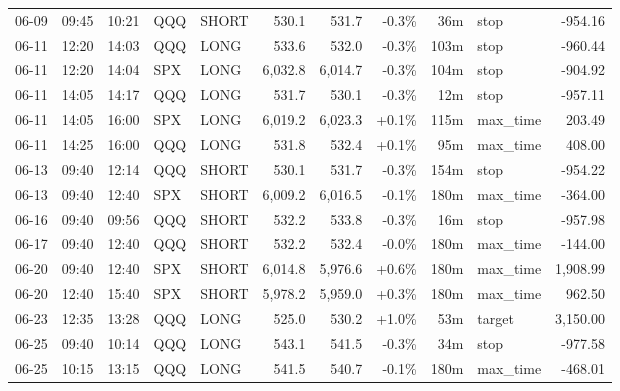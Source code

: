 \documentclass[11pt,a4paper,twoside]{article}
\begin{document}
\begin{center}
\begin{longtable}{>{\color{txtmain}}l l l l l r r r r >{\color{txtmain}}l r}
06-09 & 09:45 & 10:21 & QQQ & SHORT & 530.1 & 531.7 & \textcolor{lossred}{-0.3\%} & 36m & stop & \textcolor{lossred}{-954.16} \\
06-11 & 12:20 & 14:03 & QQQ & LONG & 533.6 & 532.0 & \textcolor{lossred}{-0.3\%} & 103m & stop & \textcolor{lossred}{-960.44} \\
06-11 & 12:20 & 14:04 & SPX & LONG & 6,032.8 & 6,014.7 & \textcolor{lossred}{-0.3\%} & 104m & stop & \textcolor{lossred}{-904.92} \\
06-11 & 14:05 & 14:17 & QQQ & LONG & 531.7 & 530.1 & \textcolor{lossred}{-0.3\%} & 12m & stop & \textcolor{lossred}{-957.11} \\
06-11 & 14:05 & 16:00 & SPX & LONG & 6,019.2 & 6,023.3 & \textcolor{wingreen}{+0.1\%} & 115m & max\_time & \textcolor{wingreen}{203.49} \\
06-11 & 14:25 & 16:00 & QQQ & LONG & 531.8 & 532.4 & \textcolor{wingreen}{+0.1\%} & 95m & max\_time & \textcolor{wingreen}{408.00} \\
06-13 & 09:40 & 12:14 & QQQ & SHORT & 530.1 & 531.7 & \textcolor{lossred}{-0.3\%} & 154m & stop & \textcolor{lossred}{-954.22} \\
06-13 & 09:40 & 12:40 & SPX & SHORT & 6,009.2 & 6,016.5 & \textcolor{lossred}{-0.1\%} & 180m & max\_time & \textcolor{lossred}{-364.00} \\
06-16 & 09:40 & 09:56 & QQQ & SHORT & 532.2 & 533.8 & \textcolor{lossred}{-0.3\%} & 16m & stop & \textcolor{lossred}{-957.98} \\
06-17 & 09:40 & 12:40 & QQQ & SHORT & 532.2 & 532.4 & \textcolor{lossred}{-0.0\%} & 180m & max\_time & \textcolor{lossred}{-144.00} \\
06-20 & 09:40 & 12:40 & SPX & SHORT & 6,014.8 & 5,976.6 & \textcolor{wingreen}{+0.6\%} & 180m & max\_time & \textcolor{wingreen}{1,908.99} \\
06-20 & 12:40 & 15:40 & SPX & SHORT & 5,978.2 & 5,959.0 & \textcolor{wingreen}{+0.3\%} & 180m & max\_time & \textcolor{wingreen}{962.50} \\
06-23 & 12:35 & 13:28 & QQQ & LONG & 525.0 & 530.2 & \textcolor{wingreen}{+1.0\%} & 53m & target & \textcolor{wingreen}{3,150.00} \\
06-25 & 09:40 & 10:14 & QQQ & LONG & 543.1 & 541.5 & \textcolor{lossred}{-0.3\%} & 34m & stop & \textcolor{lossred}{-977.58} \\
06-25 & 10:15 & 13:15 & QQQ & LONG & 541.5 & 540.7 & \textcolor{lossred}{-0.1\%} & 180m & max\_time & \textcolor{lossred}{-468.01} \\

\end{longtable}
\end{center}
\end{document}
